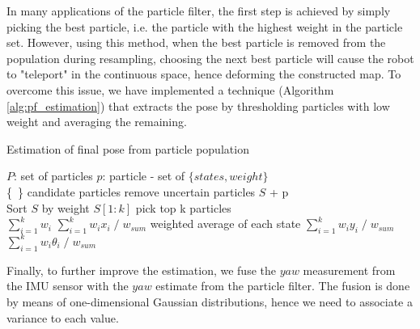 In many applications of the particle filter, the first step is achieved
by simply picking the best particle, i.e. the particle with the highest
weight in the particle set.
However, using this method, when the best particle is removed from the
population during resampling, choosing the next best particle will cause the
robot to "teleport" in the continuous space, hence deforming the constructed
map.
To overcome this issue, we have implemented a technique
(Algorithm \ref{alg:pf_estimation}) that extracts the pose by thresholding
particles with low weight and averaging the remaining.

\begin{algorithm}
    \caption{Estimation of final pose from particle population}
    \label{alg:pf_estimation}
    \begin{algorithmic}[1]
        \State $P$: set of particles
        \State $p$: particle - set of $\{states, weight\}$ \\

         {\{\ \}}
        \Comment candidate particles
                \Comment remove uncertain particles
                 {$S$ + p}
            \EndIf
        \EndFor \\

        \State Sort $S$ by weight
         {$S[1:k]$}
        \Comment pick top k particles \\

         {$\sum^k_{i=1} w_i$}
         {$\sum^k_{i=1} w_i x_i \; / \; w_{sum}$}
        \Comment weighted average of each state
         {$\sum^k_{i=1} w_i y_i \; / \; w_{sum}$}
        \Let {$\theta$} {$\sum^k_{i=1} w_i \theta_i \; / \; w_{sum}$}
    \end{algorithmic}
\end{algorithm}

Finally, to further improve the estimation, we fuse the $yaw$ measurement from
the IMU sensor with the $yaw$ estimate from the particle filter.
The fusion is done by means of one-dimensional Gaussian distributions,
hence we need to associate a variance to each value.

